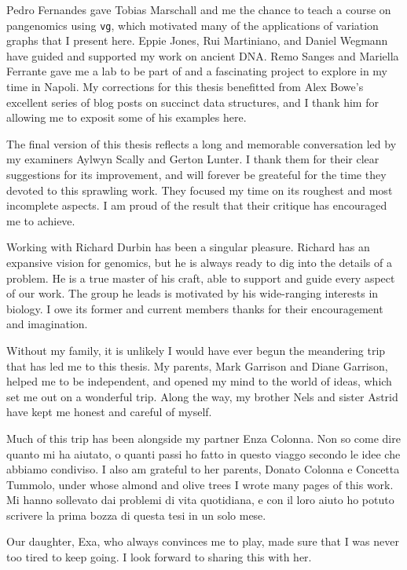 \begin{acknowledgements}
  Pedro Fernandes gave Tobias Marschall and me the chance to teach a course on pangenomics using {\tt vg}, which motivated many of the applications of variation graphs that I present here.
  Eppie Jones, Rui Martiniano, and Daniel Wegmann have guided and supported my work on ancient DNA.
  Remo Sanges and Mariella Ferrante gave me a lab to be part of and a fascinating project to explore in my time in Napoli.
  My corrections for this thesis benefitted from Alex Bowe's excellent series of blog posts on succinct data structures, and I thank him for allowing me to exposit some of his examples here.

  The final version of this thesis reflects a long and memorable conversation led by my examiners Aylwyn Scally and Gerton Lunter.
  I thank them for their clear suggestions for its improvement, and will forever be greateful for the time they devoted to this sprawling work.
  They focused my time on its roughest and most incomplete aspects.
  I am proud of the result that their critique has encouraged me to achieve.
  
  Working with Richard Durbin has been a singular pleasure.
  Richard has an expansive vision for genomics, but he is always ready to dig into the details of a problem.
  He is a true master of his craft, able to support and guide every aspect of our work.
  The group he leads is motivated by his wide-ranging interests in biology.
  I owe its former and current members thanks for their encouragement and imagination.

  Without my family, it is unlikely I would have ever begun the meandering trip that has led me to this thesis.
  My parents, Mark Garrison and Diane Garrison, helped me to be independent, and opened my mind to the world of ideas, which set me out on a wonderful trip.
  Along the way, my brother Nels and sister Astrid have kept me honest and careful of myself.

  Much of this trip has been alongside my partner Enza Colonna.
  Non so come dire quanto mi ha aiutato, o quanti passi ho fatto in questo viaggo secondo le idee che abbiamo condiviso.
  I also am grateful to her parents, Donato Colonna e Concetta Tummolo, under whose almond and olive trees I wrote many pages of this work.
  Mi hanno sollevato dai problemi di vita quotidiana, e con il loro aiuto ho potuto scrivere la prima bozza di questa tesi in un solo mese.
  
  Our daughter, Exa, who always convinces me to play, made sure that I was never too tired to keep going.
  I look forward to sharing this with her.

\end{acknowledgements}
